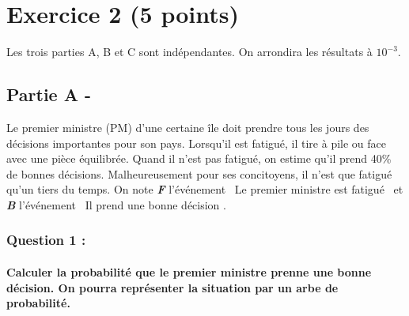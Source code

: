 \documentclass[a4paper, 12pt]{article}
\begin{document}
{}
\section*{Exercice 2 (5 points)}

Les trois parties A, B et C sont indépendantes. On arrondira les résultats à $10^{-3}$.

{}
\subsection*{Partie A - }
Le premier ministre (PM) d'une certaine île doit prendre tous les jours des décisions importantes pour son pays. Lorsqu'il est fatigué, il tire à pile ou face avec une pièce équilibrée.
Quand il n'est pas fatigué, on estime qu'il prend 40\% de bonnes décisions. Malheureusement pour ses concitoyens, il n'est que fatigué qu'un tiers du temps. On note \emph{\textbf{F}} l'événement 
\guillemotleft \ Le premier ministre est fatigué \guillemotright \ et \emph{\textbf{B}} l'événement \guillemotleft \ Il prend une bonne décision \guillemotright.

{}
\subsubsection*{Question 1 :}
\paragraph*{Calculer la probabilité que le premier ministre prenne une bonne décision. On pourra représenter la situation par un arbe de probabilité.\\[5mm]}
\end{document}
